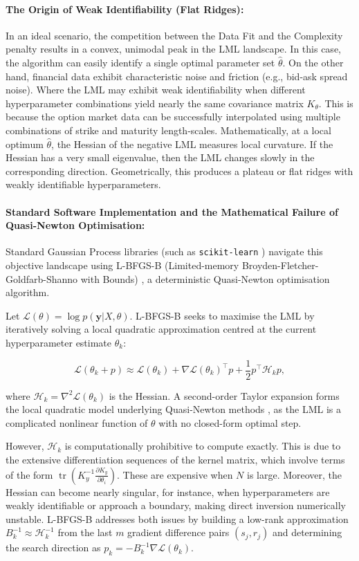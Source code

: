 \documentclass[12pt,oneside]{report}
\theoremstyle{definition}
\theoremstyle{remark}
\begin{document}
\paragraph{The Origin of Weak Identifiability (Flat Ridges):}
In an ideal scenario, the competition between the Data Fit and the Complexity penalty results in a convex, unimodal peak in the LML landscape. In this case, the algorithm can easily identify a single optimal parameter set $\hat{\theta}$. On the other hand, financial data exhibit characteristic noise and friction (e.g., bid-ask spread noise). Where the LML may exhibit weak identifiability when different hyperparameter combinations yield nearly the same covariance matrix $K_\theta$. This is because the option market data can be successfully interpolated using multiple combinations of strike and maturity length-scales. Mathematically, at a local optimum $\hat{\theta}$, the Hessian of the negative LML measures local curvature. If the Hessian has a very small eigenvalue, then the LML changes slowly in the corresponding direction. Geometrically, this produces a plateau or flat ridges with weakly identifiable hyperparameters.

\paragraph{Standard Software Implementation and the Mathematical Failure of Quasi-Newton Optimisation:} Standard Gaussian Process libraries (such as \texttt{scikit-learn} \cite{pedregosa2011scikit}) navigate this objective landscape using L-BFGS-B (Limited-memory Broyden-Fletcher-Goldfarb-Shanno with Bounds) \cite{byrd1995lbfgsb}, a deterministic Quasi-Newton optimisation algorithm.

Let $\mathcal{L}(\theta) = \log p(\mathbf{y} | X, \theta)$. L-BFGS-B seeks to maximise the LML by iteratively solving a local quadratic approximation centred at the current hyperparameter estimate $\theta_k$:

$$\mathcal{L}(\theta_k + p) \approx \mathcal{L}(\theta_k) + \nabla \mathcal{L}(\theta_k)^\top p + \frac{1}{2} p^\top \mathcal{H}_k p,$$

where $\mathcal{H}_k = \nabla^2 \mathcal{L}(\theta_k)$ is the Hessian. A second-order Taylor expansion forms the local quadratic model underlying Quasi-Newton methods \cite{nocedal2006numerical}, as the LML is a complicated nonlinear function of $\theta$ with no closed-form optimal step.

However, $\mathcal{H}_k$ is computationally prohibitive to compute exactly. This is due to the extensive differentiation sequences of the kernel matrix, which involve terms of the form $\operatorname{tr}\left(K_y^{-1} \frac{\partial K_y}{\partial \theta_i}\right)$. These are expensive when $N$ is large. Moreover, the Hessian can become nearly singular, for instance, when hyperparameters are weakly identifiable or approach a boundary, making direct inversion numerically unstable. L-BFGS-B addresses both issues by building a low-rank approximation $B_k^{-1} \approx \mathcal{H}_k^{-1}$ from the last $m$ gradient difference pairs $(s_j, r_j)$ and determining the search direction as $p_k = -B_k^{-1} \nabla \mathcal{L}(\theta_k)$.
\end{document}
